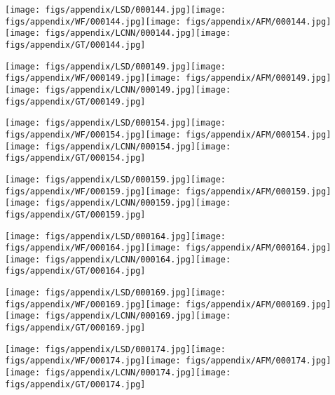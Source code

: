 \documentclass[10pt,twocolumn,letterpaper]{article}
\begin{document}
\texttt{[image: figs/appendix/LSD/000144.jpg]}\texttt{[image: figs/appendix/WF/000144.jpg]}\texttt{[image: figs/appendix/AFM/000144.jpg]}\texttt{[image: figs/appendix/LCNN/000144.jpg]}\texttt{[image: figs/appendix/GT/000144.jpg]}

\texttt{[image: figs/appendix/LSD/000149.jpg]}\texttt{[image: figs/appendix/WF/000149.jpg]}\texttt{[image: figs/appendix/AFM/000149.jpg]}\texttt{[image: figs/appendix/LCNN/000149.jpg]}\texttt{[image: figs/appendix/GT/000149.jpg]}

\texttt{[image: figs/appendix/LSD/000154.jpg]}\texttt{[image: figs/appendix/WF/000154.jpg]}\texttt{[image: figs/appendix/AFM/000154.jpg]}\texttt{[image: figs/appendix/LCNN/000154.jpg]}\texttt{[image: figs/appendix/GT/000154.jpg]}

\texttt{[image: figs/appendix/LSD/000159.jpg]}\texttt{[image: figs/appendix/WF/000159.jpg]}\texttt{[image: figs/appendix/AFM/000159.jpg]}\texttt{[image: figs/appendix/LCNN/000159.jpg]}\texttt{[image: figs/appendix/GT/000159.jpg]}

\texttt{[image: figs/appendix/LSD/000164.jpg]}\texttt{[image: figs/appendix/WF/000164.jpg]}\texttt{[image: figs/appendix/AFM/000164.jpg]}\texttt{[image: figs/appendix/LCNN/000164.jpg]}\texttt{[image: figs/appendix/GT/000164.jpg]}

\texttt{[image: figs/appendix/LSD/000169.jpg]}\texttt{[image: figs/appendix/WF/000169.jpg]}\texttt{[image: figs/appendix/AFM/000169.jpg]}\texttt{[image: figs/appendix/LCNN/000169.jpg]}\texttt{[image: figs/appendix/GT/000169.jpg]}

\texttt{[image: figs/appendix/LSD/000174.jpg]}\texttt{[image: figs/appendix/WF/000174.jpg]}\texttt{[image: figs/appendix/AFM/000174.jpg]}\texttt{[image: figs/appendix/LCNN/000174.jpg]}\texttt{[image: figs/appendix/GT/000174.jpg]}
\end{document}
